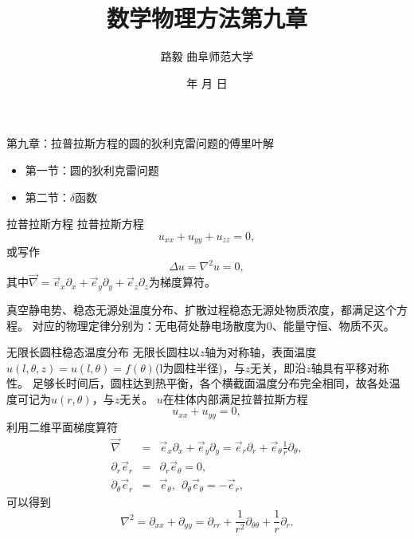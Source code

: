\documentclass[11pt]{beamer}
\newcommand{\kong}[1][0.5]{\vspace{#1cm}}
\begin{document}
	\author{ 路毅 \hspace{0.3cm} 曲阜师范大学 }
	\date{\number\year 年 \number\month 月 \number\day 日}
	\title{数学物理方法第九章}

\begin{frame}
	\maketitle
\end{frame}

\kaishu

\begin{frame}{第九章：拉普拉斯方程的圆的狄利克雷问题的傅里叶解}
\begin{itemize}
	\item 第一节：圆的狄利克雷问题
	\vspace{1cm}
	\item 第二节：$\delta$函数
\end{itemize}
\end{frame}

\begin{frame}{拉普拉斯方程}
拉普拉斯方程
\begin{equation}
u_{xx} + u_{yy} + u_{zz} = 0,
\end{equation}
或写作
\begin{equation}
\Delta u = \nabla^2 u = 0,
\end{equation}
其中$\vec{\nabla} = \vec{e}_x \partial_x + \vec{e}_y \partial_y + \vec{e}_z \partial_z$为梯度算符。

\kong[1]
真空静电势、稳态无源处温度分布、扩散过程稳态无源处物质浓度，都满足这个方程。
对应的物理定律分别为：无电荷处静电场散度为0、能量守恒、物质不灭。

\end{frame}

\begin{frame}{无限长圆柱稳态温度分布}
无限长圆柱以$z$轴为对称轴，表面温度$u(l,\theta,z)=u(l,\theta)=f(\theta)$(l为圆柱半径)，与$z$无关，即沿$z$轴具有平移对称性。
足够长时间后，圆柱达到热平衡，各个横截面温度分布完全相同，故各处温度可记为$u(r,\theta)$，与$z$无关。
$u$在柱体内部满足拉普拉斯方程
\begin{equation}
u_{xx} + u_{yy} = 0,
\end{equation}
利用二维平面梯度算符
\begin{eqnarray}
\vec{\nabla} &=& \vec{e}_x \partial_x + \vec{e}_y \partial_y = \vec{e}_r \partial_r + \vec{e}_\theta \frac{1}{r}\partial_\theta, \\
\partial_r \vec{e}_r &=& \partial_r \vec{e}_\theta = 0, \\
\partial_\theta \vec{e}_r &=& \vec{e}_\theta, ~~ \partial_\theta \vec{e}_\theta = - \vec{e}_r,
\end{eqnarray}
可以得到
\begin{equation}
\nabla^2 = \partial_{xx} + \partial_{yy} = \partial_{rr} + \frac{1}{r^2}\partial_{\theta \theta} + \frac{1}{r} \partial_r.
\end{equation}
\end{frame}
\end{document}
